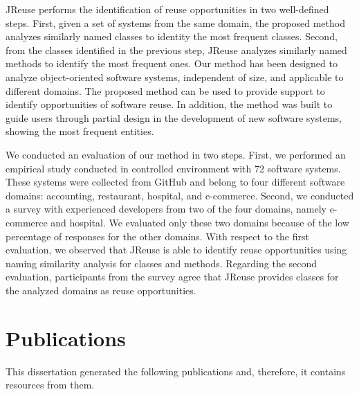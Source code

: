 JReuse performs the identification of reuse opportunities in two well-defined steps. First, given a set of systems from the same domain, the proposed method analyzes similarly named classes to identity the most frequent classes. Second, from the classes identified in the previous step, JReuse analyzes similarly named methods to identify the most frequent ones. Our method has been designed to analyze object-oriented software systems, independent of size, and applicable to different domains. The proposed method can be used to provide support to identify opportunities of software reuse. In addition, the method was built to guide users through partial design in the development of new software systems, showing the most frequent entities.


We conducted an evaluation of our method in two steps.  First, we performed an empirical study conducted in controlled environment with 72 software systems. These systems were collected from GitHub and belong to four different software domains: accounting, restaurant, hospital, and e-commerce. Second, we conducted  a survey with experienced developers from two of the four domains, namely e-commerce and hospital. We evaluated only these two domains because of the low percentage of responses for the other domains. With respect to the first evaluation, we  observed that JReuse is able to identify reuse opportunities using naming similarity analysis for classes and methods. Regarding the second evaluation, participants from the survey agree that JReuse provides classes for the analyzed domains as reuse opportunities.




\section{Publications}
\label{sec:publications}

This dissertation generated the following publications and, therefore, it contains resources from them.

